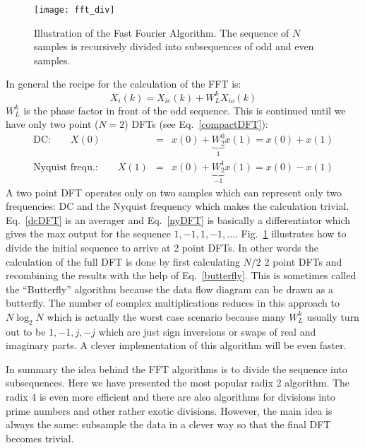 \documentclass[12pt,a4paper]{article}
\begin{document}
\begin{figure}[!hbt]
\begin{center}
\mbox{\texttt{[image: fft\_div]}}
\end{center}
\caption{Illustration of the Fast Fourier Algorithm. The sequence
of $N$ samples is recursively divided into subsequences of odd and
even samples.
\label{fft_div}}
\end{figure}

In general the recipe for the calculation of the FFT is:
\begin{equation}
X_{i}(k) = X_{ie}(k) + W_{L}^{k} X_{io}(k)
\label{butterfly}
\end{equation}
$W_{L}^{k}$ is the phase factor in front of the odd sequence.
This is continued until we have only two point ($N=2$) 
DFTs (see Eq.~\ref{compactDFT}):
\begin{eqnarray}
\mbox{DC:} \qquad X(0) & = & x(0) + \underbrace{W_2^0}_{1} x(1) = x(0) + x(1) \label{dcDFT}\\
\mbox{Nyquist frequ.:} \qquad X(1) & = & x(0) + \underbrace{W_2^1}_{-1} x(1) = x(0) - x(1) \label{nyDFT}
\end{eqnarray}
A two point DFT operates only on two samples which can represent only
two frequencies: DC and the Nyquist frequency which makes the
calculation trivial. Eq.~\ref{dcDFT} is an averager and
Eq.~\ref{nyDFT} is basically a differentiator which gives the max output
for the sequence $1,-1,1,-1,\ldots$.  Fig.~\ref{fft_div} illustrates
how to divide the initial sequence to arrive at 2 point DFTs. In other
words the calculation of the full DFT is done by first calculating
$N/2$ 2 point DFTs and recombining the results with the help of
Eq.~\ref{butterfly}. This is sometimes called the ``Butterfly''
algorithm because the data flow diagram can be drawn as a butterfly.
The number of complex multiplications reduces in this approach to $N
\log_2 N$ which is actually the worst case scenario because many
$W_{L}^{k}$ usually turn out to be $1,-1,j,-j$ which are just sign
inversions or swaps of real and imaginary parts. A clever
implementation of this algorithm will be even faster.

In summary the idea behind the FFT algorithms is to divide the sequence
into subsequences. Here we have presented the most popular radix 2 algorithm.
The radix 4 is even more efficient and there are also algorithms
for divisions into prime numbers and other rather exotic divisions.
However, the main idea is always the same: subsample the data in a clever
way so that the final DFT becomes trivial.
\end{document}
